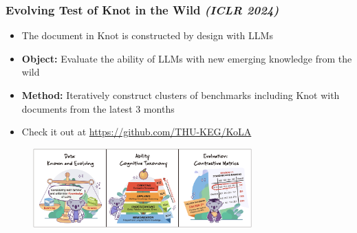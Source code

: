 \documentclass{beamer}
\begin{document}
\begin{frame}
    \frametitle{Evolving Test of Knot in the Wild \textit{{(ICLR 2024)}}}
    \begin{itemize}
        \item The document in Knot is constructed by design with LLMs
        \item \textbf{Object:} Evaluate the ability of LLMs with new emerging knowledge from the wild
        \item \textbf{Method:} Iteratively construct clusters of benchmarks including Knot with documents from the latest 3 months

        \item Check it out at \url{https://github.com/THU-KEG/KoLA}
    \end{itemize}
    
    \begin{figure}
        \includegraphics[width=0.75\textwidth]{figure/kola.png}
    \end{figure}
\end{frame}


\backmatter
{}


\end{document}

